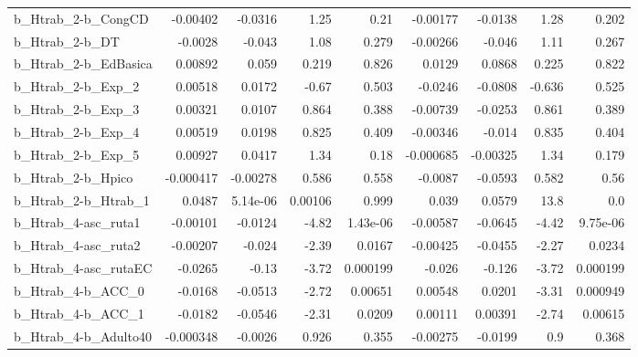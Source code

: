 \begin{tabular}{lrrrrrrrr}
b\_Htrab\_2-b\_CongCD         &    -0.00402 &      -0.0316 &     1.25 &     0.21 &   -0.00177 &     -0.0138 &         1.28 &         0.202 \\
b\_Htrab\_2-b\_DT             &     -0.0028 &       -0.043 &     1.08 &    0.279 &   -0.00266 &      -0.046 &         1.11 &         0.267 \\
b\_Htrab\_2-b\_EdBasica       &     0.00892 &        0.059 &    0.219 &    0.826 &     0.0129 &      0.0868 &        0.225 &         0.822 \\
b\_Htrab\_2-b\_Exp\_2          &     0.00518 &       0.0172 &    -0.67 &    0.503 &    -0.0246 &     -0.0808 &       -0.636 &         0.525 \\
b\_Htrab\_2-b\_Exp\_3          &     0.00321 &       0.0107 &    0.864 &    0.388 &   -0.00739 &     -0.0253 &        0.861 &         0.389 \\
b\_Htrab\_2-b\_Exp\_4          &     0.00519 &       0.0198 &    0.825 &    0.409 &   -0.00346 &      -0.014 &        0.835 &         0.404 \\
b\_Htrab\_2-b\_Exp\_5          &     0.00927 &       0.0417 &     1.34 &     0.18 &  -0.000685 &    -0.00325 &         1.34 &         0.179 \\
b\_Htrab\_2-b\_Hpico          &   -0.000417 &     -0.00278 &    0.586 &    0.558 &    -0.0087 &     -0.0593 &        0.582 &          0.56 \\
b\_Htrab\_2-b\_Htrab\_1        &      0.0487 &     5.14e-06 &  0.00106 &    0.999 &      0.039 &      0.0579 &         13.8 &           0.0 \\
b\_Htrab\_4-asc\_ruta1        &    -0.00101 &      -0.0124 &    -4.82 & 1.43e-06 &   -0.00587 &     -0.0645 &        -4.42 &      9.75e-06 \\
b\_Htrab\_4-asc\_ruta2        &    -0.00207 &       -0.024 &    -2.39 &   0.0167 &   -0.00425 &     -0.0455 &        -2.27 &        0.0234 \\
b\_Htrab\_4-asc\_rutaEC       &     -0.0265 &        -0.13 &    -3.72 & 0.000199 &     -0.026 &      -0.126 &        -3.72 &      0.000199 \\
b\_Htrab\_4-b\_ACC\_0          &     -0.0168 &      -0.0513 &    -2.72 &  0.00651 &    0.00548 &      0.0201 &        -3.31 &      0.000949 \\
b\_Htrab\_4-b\_ACC\_1          &     -0.0182 &      -0.0546 &    -2.31 &   0.0209 &    0.00111 &     0.00391 &        -2.74 &       0.00615 \\
b\_Htrab\_4-b\_Adulto40       &   -0.000348 &      -0.0026 &    0.926 &    0.355 &   -0.00275 &     -0.0199 &          0.9 &         0.368 \\

\end{tabular}
